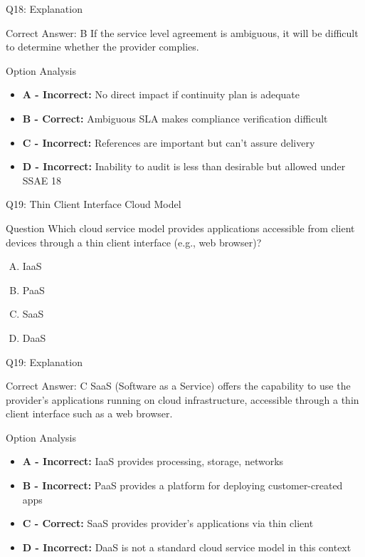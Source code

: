 \documentclass{beamer}
\begin{document}
	\begin{frame}{Q18: Explanation}
		\begin{block}{Correct Answer: B}
			If the service level agreement is ambiguous, it will be difficult to determine whether the provider complies.
		\end{block}
		\begin{block}{Option Analysis}
			\begin{itemize}
				\item \textbf{A - Incorrect:} No direct impact if continuity plan is adequate
				\item \textbf{B - Correct:} Ambiguous SLA makes compliance verification difficult
				\item \textbf{C - Incorrect:} References are important but can't assure delivery
				\item \textbf{D - Incorrect:} Inability to audit is less than desirable but allowed under SSAE 18
			\end{itemize}
		\end{block}
	\end{frame}
	
	\begin{frame}{Q19: Thin Client Interface Cloud Model}
		\begin{block}{Question}
			Which cloud service model provides applications accessible from client devices through a thin client interface (e.g., web browser)?
		\end{block}
		\begin{enumerate}[(A)]
			\item IaaS
			\item PaaS
			\item SaaS
			\item DaaS
		\end{enumerate}
	\end{frame}
	
	\begin{frame}{Q19: Explanation}
		\begin{block}{Correct Answer: C}
			SaaS (Software as a Service) offers the capability to use the provider's applications running on cloud infrastructure, accessible through a thin client interface such as a web browser.
		\end{block}
		\begin{block}{Option Analysis}
			\begin{itemize}
				\item \textbf{A - Incorrect:} IaaS provides processing, storage, networks
				\item \textbf{B - Incorrect:} PaaS provides a platform for deploying customer-created apps
				\item \textbf{C - Correct:} SaaS provides provider's applications via thin client
				\item \textbf{D - Incorrect:} DaaS is not a standard cloud service model in this context
			\end{itemize}
		\end{block}
	\end{frame}
	
\end{document}

